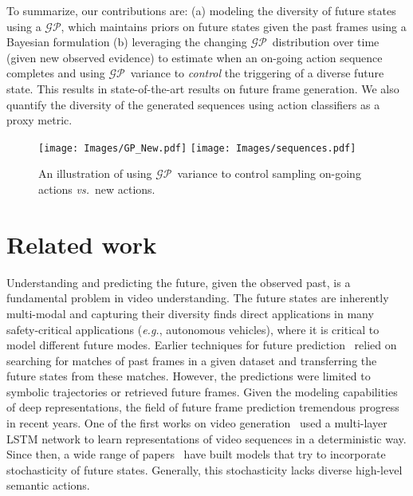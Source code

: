 \documentclass{article} \usepackage{iclr2021_conference,times}
\newcommand{\GP}{$\mathcal{GP}$}
\def\eg{\emph{e.g.}}
\def\vs{\emph{vs.}}
\begin{document}
To summarize, our contributions are: (a) modeling the diversity of future states using a \GP, which maintains priors on future states given the past frames using a Bayesian formulation (b) leveraging the changing \GP\ distribution over time (given new observed evidence) to estimate when an on-going action sequence completes and using \GP\ variance to \emph{control} the triggering of a diverse future state. This results in state-of-the-art results on future frame generation. We also quantify the diversity of the generated sequences using action classifiers as a proxy metric.

\begin{figure}
    \centering
    \vspace{-0.05in}
\texttt{[image: Images/GP\_New.pdf]}\hfill
    \texttt{[image: Images/sequences.pdf]}
\vspace{-0.05in}
    \caption{An illustration of using \GP\ variance to control sampling on-going actions \vs\ new actions.}
    \vspace{-0.2in}
    \label{fig:gp_illus}
\end{figure}



\section{Related work}
Understanding and predicting the future, given the observed past, is a fundamental problem in video understanding. The future states are inherently multi-modal and capturing their diversity finds direct applications in many safety-critical applications (\eg, autonomous vehicles), where it is critical to model different future modes. Earlier techniques for future prediction~\citep{yuen2010data,walker2014patch} relied on searching for matches of past frames in a given dataset and transferring the future states from these matches. However, the predictions were limited to symbolic trajectories or retrieved future frames. Given the modeling capabilities of deep representations, the field of future frame prediction tremendous progress in recent years. One of the first works on video generation~\citep{Srivastava:2015:ULV:3045118.3045209} used a multi-layer LSTM network to learn representations of video sequences in a deterministic way. Since then, a wide range of  papers~\citep{Oliu:2017,Cricri:2016,VillegasYHLL17,Elsayed:2019,villegas2019high,wang2018eidetic,Castrejon:2019} have built models that try to incorporate stochasticity of future states. Generally, this stochasticity lacks diverse high-level semantic actions.
\end{document}
